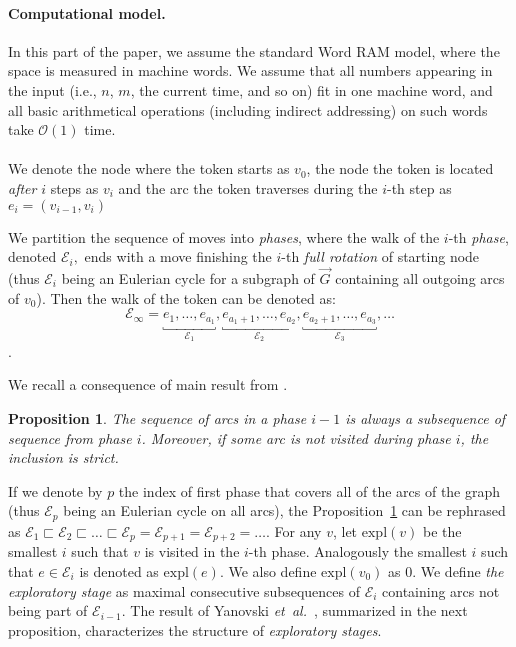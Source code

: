 \documentclass{article}[11pt,letter]
\newtheorem{proposition}[definition]{Proposition}
\newcommand{\bigo}{\mathcal{O}}
\newcommand{\expl}{\mathrm{expl}}
\newcommand{\walk}{\mathcal{E}}
\newcommand{\etal}{{\it et~al.}}
\begin{document}
\paragraph{Computational model.}
In this part of the paper, we assume the standard Word RAM model, where the space is measured in machine words.
We assume that all numbers appearing in the input (i.e., $n$, $m$, the current time, and so on) fit in one machine word, and all basic
arithmetical operations (including indirect addressing) on such words take $\bigo(1)$ time.
\\
\\
We denote the node where the token starts as $v_0$, the node the token is located \emph{after} $i$ steps as $v_{i}$ and the arc the token traverses during the $i$-th step as $e_i = (v_{i-1},v_{i})$

We partition the sequence of moves into \emph{phases}, where the walk of the $i$-th \emph{phase}, denoted $\walk_i,$ ends with a move finishing the $i$-th \emph{full rotation} of starting node (thus $\walk_i$ being an Eulerian cycle for a subgraph of $\vec{G}$ containing all outgoing arcs of $v_0$).
Then the walk of the token can be denoted as:
$$ \walk_{\infty} = \underbracket{e_1,\ldots,e_{a_1}}_{\walk_1},\underbracket{e_{a_1+1},\ldots,e_{a_2}}_{\walk_2},\underbracket{e_{a_2+1},\ldots,e_{a_3}}_{\walk_3},\ldots $$.

We recall a consequence of main result from \cite{YanovskiWB03}.
\begin{proposition}
\label{proposition:1}
The sequence of arcs in a phase $i-1$ is always a subsequence of sequence from phase $i$. Moreover, if some arc is not visited during phase $i$, the inclusion is strict.
\end{proposition}
If we denote by $p$ the index of first phase that covers all of the arcs of the graph (thus $\walk_p$ being an Eulerian cycle on all arcs), the Proposition~\ref{proposition:1} can be rephrased as
$ \walk_1 \sqsubset \walk_2 \sqsubset \ldots \sqsubset \walk_p = \walk_{p+1} = \walk_{p+2} = \ldots $.
For any $v$, let $\expl(v)$ be the smallest $i$ such that $v$ is visited in the $i$-th phase.
Analogously the smallest $i$ such that $e \in \walk_i$ is denoted as $\expl(e)$. We also define $\expl(v_0)$ as $0$.
We define \emph{the exploratory stage} as maximal consecutive subsequences of $\walk_i$ containing arcs not being part of $\walk_{i-1}$.
The result of Yanovski \etal\ \cite{YanovskiWB03}, summarized in the next proposition, characterizes the structure of \emph{exploratory stages}.
\end{document}
